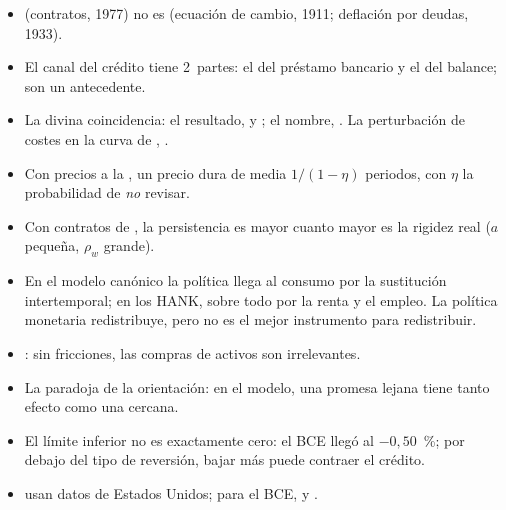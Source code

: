 \documentclass[11pt]{article}
\begin{document}
\begin{itemize}
\item {} (contratos, 1977) no es  (ecuación de cambio, 1911; deflación por deudas, 1933).
\item El canal del crédito tiene 2~partes\nocite{BernankeGertler1995}: el del préstamo bancario\nocite{BernankeBlinder1988} y el del balance; \textcite{BlinderStiglitz1983} son un antecedente.
\item La divina coincidencia: el resultado, \textcite{GoodfriendKing1997New} y \textcite{RotembergWoodford1997Optimization}; el nombre, \textcite{BlanchardGali2007Real}. La perturbación de costes en la curva de , \textcite{ClaridaGaliGertler1999Science}.
\item Con precios a la , un precio dura de media $1/(1-\eta)$ periodos, con $\eta$ la probabilidad de \emph{no} revisar.
\item Con contratos de , la persistencia es mayor cuanto mayor es la rigidez real ($a$ pequeña, $\rho_w$ grande).
\item En el modelo canónico la política llega al consumo por la sustitución intertemporal; en los HANK, sobre todo por la renta y el empleo\nocite{KaplanMollViolante2018Monetary}. La política monetaria redistribuye, pero no es el mejor instrumento para redistribuir.
\item \textcite{Wallace1981ModiglianiMiller}: sin fricciones, las compras de activos son irrelevantes.
\item La paradoja de la orientación: en el modelo, una promesa lejana tiene tanto efecto como una cercana\nocite{DelNegroGiannoniPatterson2023}.
\item El límite inferior no es exactamente cero: el BCE llegó al $-0{,}50$~\%; por debajo del tipo de reversión, bajar más puede contraer el crédito.
\item \textcite{GertlerKaradi2015} usan datos de Estados Unidos; para el BCE, \textcite{AltavillaEtAl2019} y \textcite{JarocinskiKaradi2020}.
\end{itemize}

\bibliografia
\end{document}
